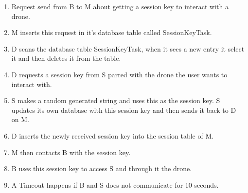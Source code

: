 \begin{enumerate}
	\item Request send from B to M about getting a session key to interact with a drone.
	\item M inserts this request in it's database table called SessionKeyTask.
	\item D scans the database table SessionKeyTask, when it sees a new entry it select it and then deletes it from the table.
	\item D requests a session key from S parred with the drone the user wants to interact with.
	\item S makes a random generated string and uses this as the session key. S updates its own database with this session key and then sends it back to D on M.
	\item D inserts the newly received session key into the session table of M.
	\item M then contacts B with the session key.
	\item B uses this session key to access S and through it the drone.
	\item A Timeout happens if B and S does not communicate for 10 seconds.
\end{enumerate}

